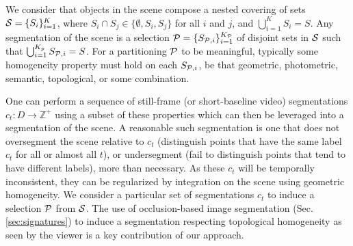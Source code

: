 We consider that objects in the scene compose a nested covering of sets $\S = \{S_i\}_{i = 1}^K$, 
where $S_i \cap S_j \in \{\emptyset, S_i, S_j\}$ for all $i$ and $j$, and $\bigcup_{i=1}^K S_i=S$. 
Any segmentation of the scene is a selection $\P = \{S_{\P,i}\}_{i=1}^{K_\P}$
of disjoint sets in $\S$ such that $\bigcup_{i=1}^{K_p}S_{\P,i} = S$. For a partitioning
$\P$ to be meaningful, typically some homogeneity property must hold on each $S_{\P,i}$, 
be that geometric, photometric, semantic, topological, or some combination. 

One can perform a sequence of still-frame (or short-baseline video) segmentations 
$c_t:D\to\mathbb{Z}^+$ using a subset of these properties
which can then be leveraged into a segmentation of the scene.
A reasonable such segmentation is one that does not oversegment the scene relative to $c_t$
(distinguish points that have the same label $c_t$ for all or almost all $t$),
or undersegment (fail to distinguish points that tend to have different labels), more than necessary.
As these $c_t$ will be temporally inconsistent, they can be regularized by integration on the scene 
using geometric homogeneity.
We consider a particular set of segmentations $c_t$ to induce a selection $\P$ from $\S$.
The use of occlusion-based image segmentation (Sec. \ref{sec:signatures})
to induce a segmentation respecting topological homogeneity as seen by the viewer
is a key contribution of our approach.

